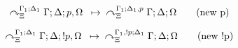 \begin{align}
\trans{
   \derstatex{\Gamma}{\Delta}{\Xi}{\Gamma_1}{\Delta_1}{p, \Omega}
      }
   {\derstatex{\Gamma}{\Delta}{\Xi}{\Gamma_1}{\Delta_1, p}{\Omega}}
   \tag{new p}
\end{align}

\begin{align}
\trans{\derstatex{\Gamma}{\Delta}{\Xi}{\Gamma_1}{\Delta_1}{\bang p, \Omega}}
{\derstatex{\Gamma}{\Delta}{\Xi}{\Gamma_1, \bang p}{\Delta_1}{\Omega}}
\tag{new \bang p}
\end{align}
